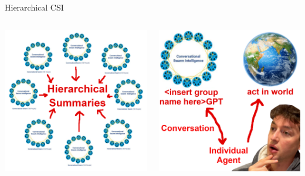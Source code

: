 \documentclass[aspectratio=169]{beamer}
\begin{document}
\begin{frame}{Hierarchical CSI}
\begin{columns}[T]
    \begin{column}[T]{0.5\textwidth}
        \includegraphics[height=0.8\textheight]{imgs/CSI_section/hierarchical_summaries.png}
    \end{column}
    \begin{column}{0.5\textwidth}
        \includegraphics[height=0.8\textheight]{imgs/CSI_section/agency.png}
    \end{column}
\end{columns}
\end{frame}
\end{document}

